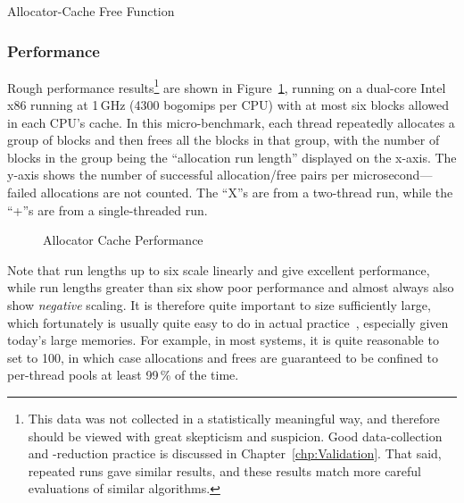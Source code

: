 \begin{listing}[tbp]

\caption{Allocator-Cache Free Function}
\label{lst:SMPdesign:Allocator-Cache Free Function}
\end{listing}

\QuickQuizEnd

\subsubsection{Performance}

Rough performance results\footnote{
	This data was not collected in a statistically meaningful way,
	and therefore should be viewed with great skepticism and suspicion.
	Good data-collection and -reduction practice is discussed
	in Chapter~\ref{chp:Validation}.
	That said, repeated runs gave similar results, and these results
	match more careful evaluations of similar algorithms.}
are shown in
Figure~\ref{fig:SMPdesign:Allocator Cache Performance},
running on a dual-core Intel x86 running at 1\,GHz (4300 bogomips per CPU)
with at most six blocks allowed in each CPU's cache.
In this micro-benchmark,
each thread repeatedly allocates a group of blocks and then frees all
the blocks in that group, with
the number of blocks in the group being the ``allocation run length''
displayed on the x-axis.
The y-axis shows the number of successful allocation/free pairs per
microsecond---failed allocations are not counted.
The ``X''s are from a two-thread run, while the ``+''s are from a
single-threaded run.

\begin{figure}[tbp]
\centering
{}
\caption{Allocator Cache Performance}
\label{fig:SMPdesign:Allocator Cache Performance}
\end{figure}

Note that run lengths up to six scale linearly and give excellent performance,
while run lengths greater than six show poor performance and almost always
also show \emph{negative} scaling.
It is therefore quite important to size 
sufficiently large,
which fortunately is usually quite easy to do in actual
practice~\cite{McKenney01e}, especially given today's large memories.
For example, in most systems, it is quite reasonable to set
 to 100, in which case allocations and frees
are guaranteed to be confined to per-thread pools at least 99\,\% of
the time.

